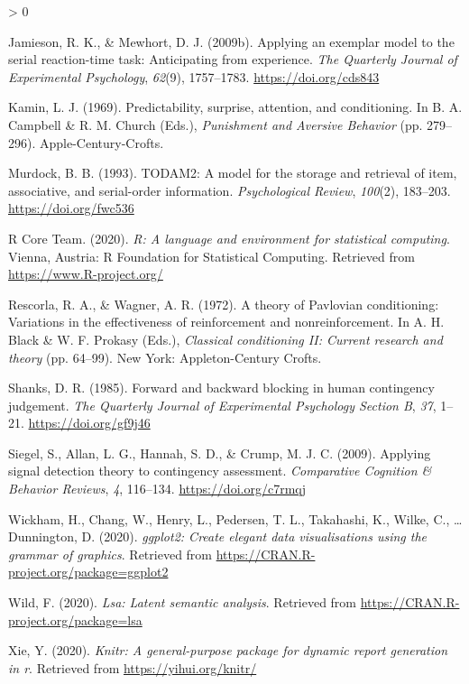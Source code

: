 \documentclass[
  english,
  man,floatsintext]{apa6}
\newlength{\cslhangindent}
\newenvironment{CSLReferences}[2] %
 {%
  \setlength{\parindent}{0pt}
  \ifodd #1 \everypar{\setlength{\hangindent}{\cslhangindent}}\ignorespaces\fi
  \ifnum #2 > 0
  \setlength{\parskip}{#2\baselineskip}
  \fi
 }%
 {}
\begin{document}
\begin{CSLReferences}{1}{0}
\leavevmode\hypertarget{ref-jamiesonApplyingExemplarModel2009a}{}%
Jamieson, R. K., \& Mewhort, D. J. (2009b). Applying an exemplar model to the serial reaction-time task: {Anticipating} from experience. \emph{The Quarterly Journal of Experimental Psychology}, \emph{62}(9), 1757--1783. \url{https://doi.org/cds843}

\leavevmode\hypertarget{ref-kaminPredictabilitySurpriseAttention1969}{}%
Kamin, L. J. (1969). Predictability, surprise, attention, and conditioning. In B. A. Campbell \& R. M. Church (Eds.), \emph{Punishment and {Aversive Behavior}} (pp. 279--296). {Apple-Century-Crofts}.

\leavevmode\hypertarget{ref-murdockTODAM2ModelStorage1993}{}%
Murdock, B. B. (1993). {TODAM2}: A model for the storage and retrieval of item, associative, and serial-order information. \emph{Psychological Review}, \emph{100}(2), 183--203. \url{https://doi.org/fwc536}

\leavevmode\hypertarget{ref-R-base}{}%
R Core Team. (2020). \emph{R: A language and environment for statistical computing}. Vienna, Austria: R Foundation for Statistical Computing. Retrieved from \url{https://www.R-project.org/}

\leavevmode\hypertarget{ref-rescorlaTheoryPavlovianConditioning1972}{}%
Rescorla, R. A., \& Wagner, A. R. (1972). A theory of {Pavlovian} conditioning: {Variations} in the effectiveness of reinforcement and nonreinforcement. In A. H. Black \& W. F. Prokasy (Eds.), \emph{Classical conditioning {II}: {Current} research and theory} (pp. 64--99). {New York: Appleton-Century Crofts}.

\leavevmode\hypertarget{ref-shanksForwardBackwardBlocking1985}{}%
Shanks, D. R. (1985). Forward and backward blocking in human contingency judgement. \emph{The Quarterly Journal of Experimental Psychology Section B}, \emph{37}, 1--21. \url{https://doi.org/gf9j46}

\leavevmode\hypertarget{ref-siegelApplyingSignalDetection2009}{}%
Siegel, S., Allan, L. G., Hannah, S. D., \& Crump, M. J. C. (2009). Applying signal detection theory to contingency assessment. \emph{Comparative Cognition \& Behavior Reviews}, \emph{4}, 116--134. \url{https://doi.org/c7rmqj}

\leavevmode\hypertarget{ref-R-ggplot2}{}%
Wickham, H., Chang, W., Henry, L., Pedersen, T. L., Takahashi, K., Wilke, C., \ldots{} Dunnington, D. (2020). \emph{ggplot2: Create elegant data visualisations using the grammar of graphics}. Retrieved from \url{https://CRAN.R-project.org/package=ggplot2}

\leavevmode\hypertarget{ref-R-lsa}{}%
Wild, F. (2020). \emph{Lsa: Latent semantic analysis}. Retrieved from \url{https://CRAN.R-project.org/package=lsa}

\leavevmode\hypertarget{ref-R-knitr}{}%
Xie, Y. (2020). \emph{Knitr: A general-purpose package for dynamic report generation in r}. Retrieved from \url{https://yihui.org/knitr/}

\end{CSLReferences}
\end{document}

